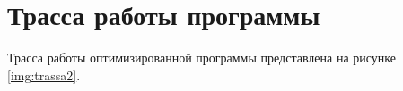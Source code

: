 \section*{Трасса работы программы}

Трасса работы оптимизированной программы представлена на рисунке \ref{img:trassa2}.




\clearpage